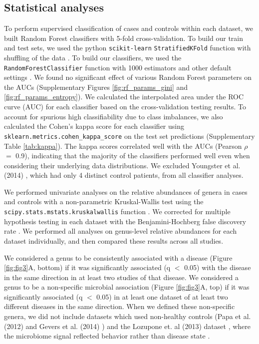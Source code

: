 \documentclass{article}
\begin{document}
{\subsection*{Statistical analyses}
To perform supervised classification of cases and controls within each dataset, we built Random Forest classifiers with 5-fold cross-validation.
To build our train and test sets, we used the python \texttt{scikit-learn} \texttt{StratifiedKFold} function with shuffling of the data \cite{scikit-learn}.
To build our classifiers, we used the \texttt{RandomForestClassifier} function with 1000 estimators and other default settings \cite{scikit-learn}.
We found no significant effect of various Random Forest parameters on the AUCs  (Supplementary Figures \ref{fig:rf_params_gini} and \ref{fig:rf_params_entropy}). 
We calculated the interpolated area under the ROC curve (AUC) for each classifier based on the cross-validation testing results.
To account for spurious high classifiability due to class imbalances, we also calculated the Cohen's kappa score for each classifier using \texttt{sklearn.metrics.cohen\_kappa\_score} on the test set predictions (Supplementary Table \ref{tab:kappa}).
The kappa scores correlated well with the AUCs (Pearson $\rho$ $=$ 0.9), indicating that the majority of the classifiers performed well even when considering their underlying data distributions.
We excluded Youngster et al. (2014) \cite{cdi-youngster}, which had only 4 distinct control patients, from all classifier analyses.

We performed univariate analyses on the relative abundances of genera in cases and controls with a non-parametric Kruskal-Wallis test using the \\ \texttt{scipy.stats.mstats.kruskalwallis} function \cite{scipy}. 
We corrected for multiple hypothesis testing in each dataset with the Benjamini-Hochberg false discovery rate \cite{benjamini-hochberg}.
We performed all analyses on genus-level relative abundances for each dataset individually, and then compared these results across all studies.

We considered a genus to be consistently associated with a disease (Figure \ref{fig:fig3}A, bottom) if it was significantly associated (q $<$ 0.05) with the disease in the same direction in at least two studies of that disease.
We considered a genus to be a non-specific microbial association (Figure \ref{fig:fig3}A, top) if it was significantly associated (q $<$ 0.05) in at least one dataset of at least two different diseases in the same direction.
When we defined these non-specific genera, we did not include datasets which used non-healthy controls (Papa et al. (2012) \cite{ibd-papa} and Gevers et al. (2014) \cite{ibd-gevers}) and the Lozupone et. al (2013) dataset \cite{lozupone2013alterations}, where the microbiome signal reflected behavior rather than disease state \cite{noguera2016gut}.

}
\end{document}
